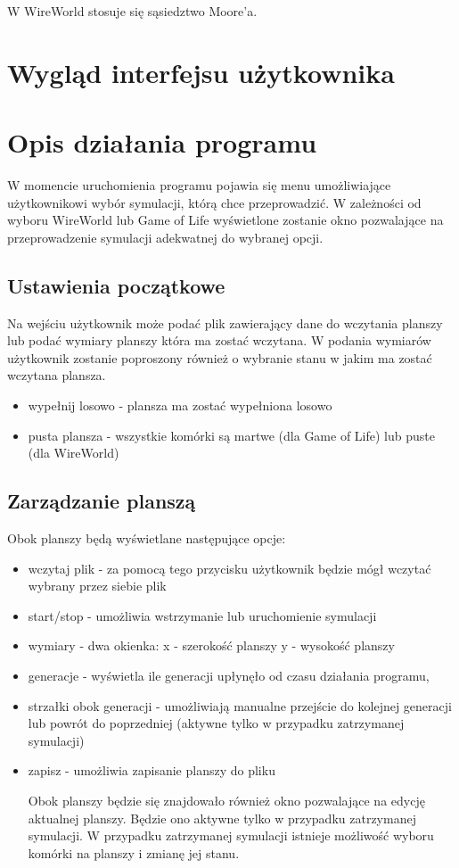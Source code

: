 \documentclass[10pt, oneside]{article}
\begin{document}
W WireWorld stosuje się sąsiedztwo Moore'a.
\section{Wygląd interfejsu użytkownika}

\section{Opis działania programu}
W momencie uruchomienia programu pojawia się menu umożliwiające użytkownikowi wybór symulacji, którą chce przeprowadzić. W zależności od wyboru WireWorld lub Game of Life wyświetlone zostanie okno pozwalające na przeprowadzenie symulacji adekwatnej do wybranej opcji.

\subsection{Ustawienia początkowe}
Na wejściu użytkownik może podać plik zawierający dane do wczytania planszy lub podać wymiary planszy która ma zostać wczytana. W podania wymiarów użytkownik zostanie poproszony również o wybranie stanu w jakim ma zostać wczytana plansza. 
\begin{itemize}
\item wypełnij losowo - plansza ma zostać wypełniona losowo
\item pusta plansza - wszystkie komórki są martwe (dla  Game of Life) lub puste (dla WireWorld)
\end{itemize}

\subsection{Zarządzanie planszą}
Obok planszy będą wyświetlane następujące opcje:
\begin{itemize}
\item wczytaj plik -  za pomocą tego przycisku użytkownik będzie mógł wczytać wybrany przez siebie plik
\item start/stop - umożliwia wstrzymanie lub uruchomienie symulacji
\item wymiary - dwa okienka: x - szerokość planszy y - wysokość planszy
\item generacje - wyświetla ile generacji upłynęło od czasu działania programu, \item strzałki obok generacji - umożliwiają manualne przejście do kolejnej generacji lub powrót do poprzedniej (aktywne tylko w przypadku zatrzymanej symulacji)
\item zapisz - umożliwia zapisanie planszy do pliku

Obok planszy będzie się znajdowało również okno pozwalające na edycję aktualnej planszy. Będzie ono aktywne tylko w przypadku zatrzymanej symulacji.
W przypadku zatrzymanej symulacji istnieje możliwość wyboru komórki na planszy i zmianę jej stanu.

\end{itemize}
\end{document}
